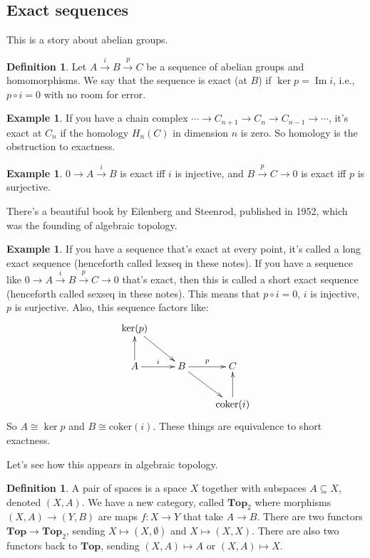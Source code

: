 \documentclass{amsart}
\theoremstyle{theorem}
\theoremstyle{definition}
\newtheorem{definition}[theorem]{Definition}
\newtheorem{example}[theorem]{Example}
\DeclareMathOperator{\img}{Im}
\begin{document}
\subsection{Exact sequences}
This is a story about abelian groups.
\begin{definition}
Let $A\xrightarrow{i} B\xrightarrow{p} C$ be a sequence of abelian groups and homomorphisms. We say that the sequence is exact (at $B$) if $\ker p=\img i$, i.e., $p\circ i=0$ with no room for error.
\end{definition}
\begin{example}
If you have a chain complex $\cdots\to C_{n+1}\to C_n\to C_{n-1}\to\cdots$, it's exact at $C_n$ if the homology $ H_n(C)$ in dimension $n$ is zero. So homology is the obstruction to exactness. 
\end{example}
\begin{example}
$0\to A\xrightarrow{i}B$ is exact iff $i$ is injective, and $B\xrightarrow{p}C\to 0$ is exact iff $p$ is surjective.
\end{example}
There's a beautiful book by Eilenberg and Steenrod, published in 1952, which was the founding of algebraic topology.
\begin{example}
If you have a sequence that's exact at every point, it's called a long exact sequence (henceforth called lexseq in these notes). If you have a sequence like $0\to A\xrightarrow{i} B\xrightarrow{p} C\to 0$ that's exact, then this is called a short exact sequence (henceforth called sexseq in these notes). This means that $p\circ i=0$, $i$ is injective, $p$ is surjective. Also, this sequence factors like:
	\begin{equation*}
	\xymatrix{\ker(p) \ar[dr] & & \\
	A\ar[u]\ar[r]^i & B\ar[r]^p\ar[dr] & C\\
	 & & \mathrm{coker}(i)\ar[u]}
	\end{equation*}
So $A\cong \ker p$ and $B\cong \mathrm{coker}(i)$. These things are equivalence to short exactness. 
\end{example}
Let's see how this appears in algebraic topology.
\begin{definition}
A pair of spaces is a space $X$ together with subspaces $A\subseteq X$, denoted $(X,A)$. We have a new category, called $\mathbf{Top}_2$ where morphisms $(X,A)\to (Y,B)$ are maps $f:X\to Y$ that take $A\to B$. There are two functors $\mathbf{Top}\to \mathbf{Top}_2$, sending $X\mapsto (X,\emptyset)$ and $X\mapsto (X,X)$. There are also two functors back to $\mathbf{Top}$, sending $(X,A)\mapsto A$ or $(X,A)\mapsto X$.
\end{definition}
\end{document}
